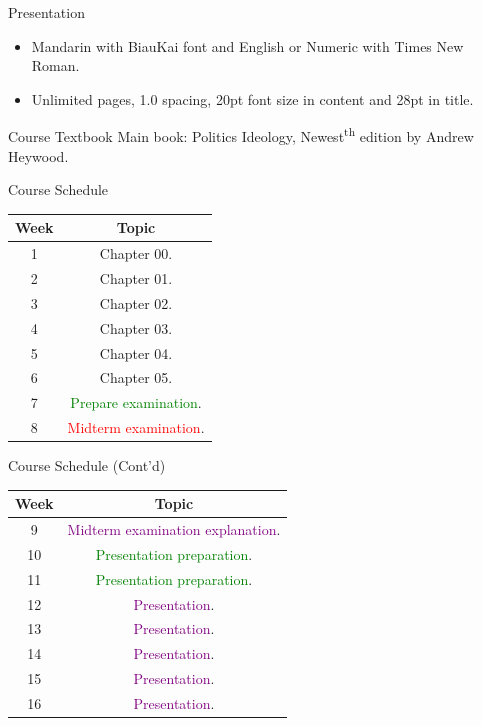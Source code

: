 \documentclass{beamer}
\begin{document}
\begin{frame}{Presentation}
\begin{itemize}
\item Mandarin with BiauKai font and English or Numeric with Times New Roman.
\item Unlimited pages, 1.0 spacing, 20pt font size in content and 28pt in title.
\end{itemize}
\end{frame}
\begin{frame}{Course Textbook}
Main book: Politics Ideology, Newest\textsuperscript{th} edition by Andrew Heywood. \\
\end{frame}
\begin{frame}{Course Schedule}
\begin{center}
\begin{tabular}{|c|c|}
\hline
Week & Topic \\
\hline
1 & Chapter 00.\\
\hline
2 & Chapter 01.\\
\hline
3 & Chapter 02.\\
\hline
4 & Chapter 03.\\
\hline
5 & Chapter 04.\\
\hline
6 & Chapter 05.\\
\hline
7 & \textcolor{Green}{Prepare examination}.\\
\hline
8 & \textcolor{red}{Midterm examination}.\\
\hline
\end{tabular}
\end{center}
\end{frame}
\begin{frame}{Course Schedule (Cont'd)}
\begin{center}
\begin{tabular}{|c|c|}
\hline
Week & Topic \\
\hline
9 & \textcolor{purple}{Midterm examination explanation}.\\
\hline
10 & \textcolor{Green}{Presentation preparation}.\\
\hline
11 & \textcolor{Green}{Presentation preparation}.\\
\hline
12 & \textcolor{purple}{Presentation}.\\
\hline
13 & \textcolor{purple}{Presentation}.\\
\hline
14 & \textcolor{purple}{Presentation}.\\
\hline
15 & \textcolor{purple}{Presentation}.\\
\hline
16 & \textcolor{purple}{Presentation}.\\
\hline
\end{tabular}
\end{center}
\end{frame}
\end{document}
